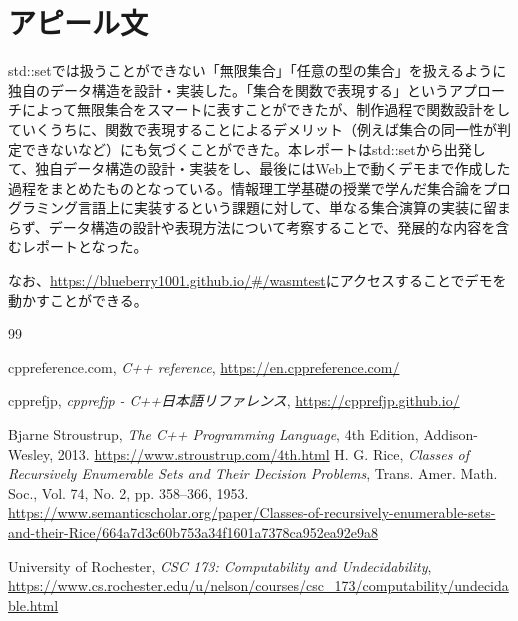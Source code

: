 \documentclass[a4paper,11pt]{ltjsarticle}
\begin{document}
\section{アピール文}
std::setでは扱うことができない「無限集合」「任意の型の集合」を扱えるように独自のデータ構造を設計・実装した。「集合を関数で表現する」というアプローチによって無限集合をスマートに表すことができたが、制作過程で関数設計をしていくうちに、関数で表現することによるデメリット（例えば集合の同一性が判定できないなど）にも気づくことができた。本レポートはstd::setから出発して、独自データ構造の設計・実装をし、最後にはWeb上で動くデモまで作成した過程をまとめたものとなっている。情報理工学基礎の授業で学んだ集合論をプログラミング言語上に実装するという課題に対して、単なる集合演算の実装に留まらず、データ構造の設計や表現方法について考察することで、発展的な内容を含むレポートとなった。

なお、\url{https://blueberry1001.github.io/#/wasmtest}にアクセスすることでデモを動かすことができる。
\begin{thebibliography}{99}

cppreference.com,
\textit{C++ reference},
\url{https://en.cppreference.com/}

cpprefjp,
\textit{cpprefjp - C++日本語リファレンス},
\url{https://cpprefjp.github.io/}

Bjarne Stroustrup,
\textit{The C++ Programming Language}, 4th Edition, Addison-Wesley, 2013.
\url{https://www.stroustrup.com/4th.html}
\newpage
{}
H. G. Rice,
\textit{Classes of Recursively Enumerable Sets and Their Decision Problems},
Trans. Amer. Math. Soc., Vol. 74, No. 2, pp. 358--366, 1953.
\url{https://www.semanticscholar.org/paper/Classes-of-recursively-enumerable-sets-and-their-Rice/664a7d3c60b753a34f1601a7378ca952ea92e9a8}

University of Rochester,
\textit{CSC 173: Computability and Undecidability},
\url{https://www.cs.rochester.edu/u/nelson/courses/csc_173/computability/undecidable.html}

\end{thebibliography}
\end{document}
